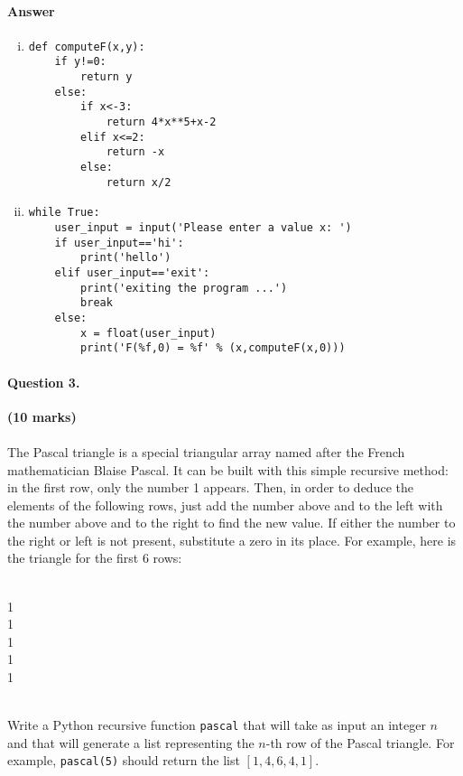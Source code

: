 \documentclass[12pt]{article}
\begin{document}
\paragraph{Answer}
\begin{enumerate}[(i)]
\item \begin{verbatim}
def computeF(x,y):
    if y!=0:
        return y
    else:
        if x<-3:
            return 4*x**5+x-2
        elif x<=2:
            return -x
        else:
            return x/2
\end{verbatim}
\item \begin{verbatim}
while True:
    user_input = input('Please enter a value x: ')
    if user_input=='hi':
        print('hello')
    elif user_input=='exit':
        print('exiting the program ...')
        break
    else:
        x = float(user_input)
        print('F(%f,0) = %f' % (x,computeF(x,0)))
\end{verbatim}
\end{enumerate}\clearpage
\paragraph{Question 3.}\hfill {\bf (10 marks)}
\\\\The Pascal triangle is a special triangular array named after the French mathematician Blaise Pascal. It can be built with this simple recursive method: in the first row, only the number 1 appears. Then, in order to deduce the elements of the following rows, just add the number above and to the left with the number above and to the right to find the new value. If either the number to the right or left is not present, substitute a zero in its place. For example, here is the triangle for the first 6 rows:\\
{\par {}\\1\\1\\1\\1\\1\\}
\mbox{}\\
Write a Python recursive function \texttt{pascal} that will take as input an integer $n$ and that will generate a list representing the $n$-th row of the Pascal triangle. For example, \texttt{pascal(5)} should return the list $[1,4,6,4,1]$.
\end{document}

